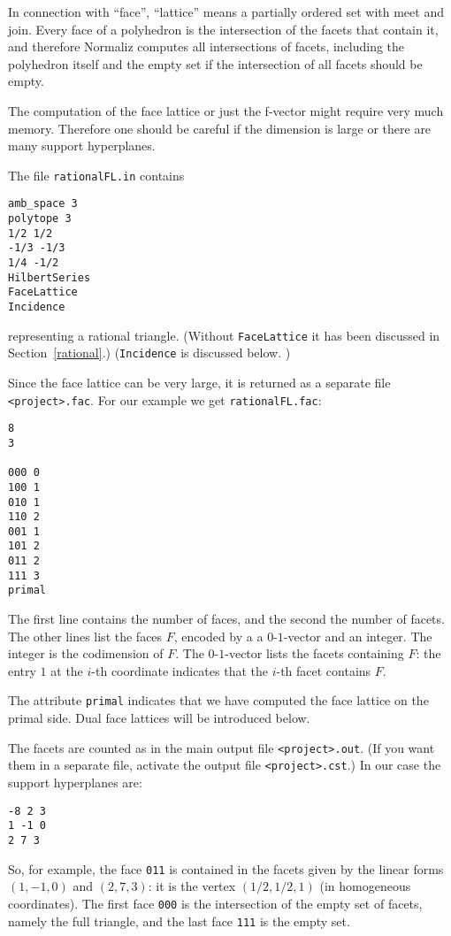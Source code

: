 \documentclass[12pt,a4paper]{scrartcl}
\theoremstyle{definition}
\begin{document}
In connection with ``face'', ``lattice'' means a partially ordered set with meet and join. Every face of a polyhedron is the intersection of the facets that contain it, and therefore Normaliz computes all intersections of facets, including the polyhedron itself and the empty set if the intersection of all facets should be empty.

The computation of the face lattice or just the f-vector might require very much memory. Therefore one should be careful if the dimension is large or there are many support hyperplanes.

The file \verb|rationalFL.in| contains
\begin{Verbatim}
amb_space 3
polytope 3
1/2 1/2
-1/3 -1/3
1/4 -1/2
HilbertSeries
FaceLattice
Incidence
\end{Verbatim}
representing a rational triangle. (Without \verb|FaceLattice| it has been discussed in Section~\ref{rational}.) (\verb|Incidence| is discussed below.
)

Since the face lattice can be very large, it is returned as a separate file \verb|<project>.fac|. For our example we get \verb|rationalFL.fac|:
\begin{Verbatim}
8
3

000 0
100 1
010 1
110 2
001 1
101 2
011 2
111 3
primal
\end{Verbatim}
The first line contains the number of faces, and the second the number of facets. The other lines list the faces $F$, encoded by a a $0$-$1$-vector and an integer. The integer is the codimension of $F$. The $0$-$1$-vector lists the facets containing $F$: the entry $1$ at the $i$-th coordinate indicates that the $i$-th facet contains $F$.

The attribute \verb|primal| indicates that we have computed the face lattice on the primal side. Dual face lattices will be introduced below.

The facets are counted as in the main output file \verb|<project>.out|. (If you want them in a separate file, activate the output file \verb|<project>.cst|.) In our case the support hyperplanes are:
\begin{Verbatim}
-8 2 3 
1 -1 0 
2 7 3
\end{Verbatim}
So, for example, the face \verb|011| is contained in the facets given by the linear forms $(1,-1,0)$ and
$(2,7,3)$: it is the vertex $(1/2,1/2,1)$ (in homogeneous coordinates). The first face \verb|000| is the intersection of the empty set of facets, namely the full triangle, and the last face \verb|111| is the empty set.
\end{document}
